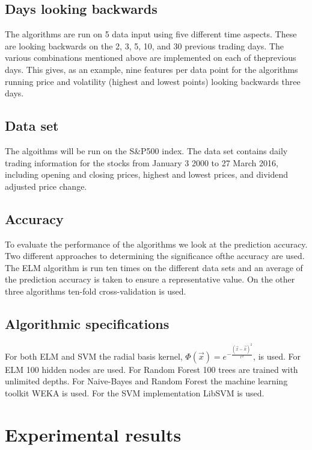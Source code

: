 \documentclass{article}
\begin{document}
\subsection{Days looking backwards}
The algorithms are run on 5 data input using five different time aspects. These are looking backwards on the 2, 3, 5, 10, and 30 previous trading days. The various combinations mentioned above are implemented on each of theprevious days. This gives, as an example, nine features per data point for the algorithms running price and volatility (highest and lowest points) looking backwards three days.

\subsection{Data set}
The algoithms will be run on the S\&P500 index. The data set contains daily trading information for the stocks from January 3 2000 to 27 March 2016, including opening and closing prices, highest and lowest prices, and dividend adjusted price change. 

\subsection{Accuracy} 
To evaluate the performance of the algorithms we look at the prediction accuracy. Two different approaches to determining the significance ofthe accuracy are used. The ELM algorithm is run ten times on the different data sets and an average of the prediction accuracy is taken to ensure a representative value. On the other three algorithms ten-fold cross-validation is used. 

\subsection{Algorithmic specifications}
For both ELM and SVM the radial basis kernel, $\Phi(\vec{x}) = e^{-\frac{(\vec{x} - \vec{k})^2}{r^2}}$, is used. For ELM 100 hidden nodes are used. For Random Forest 100 trees are trained with unlimited depths. For Naive-Bayes and Random Forest the machine learning toolkit WEKA is used. For the SVM implementation LibSVM is used. 

\newpage

\section{Experimental results}
\end{document}

